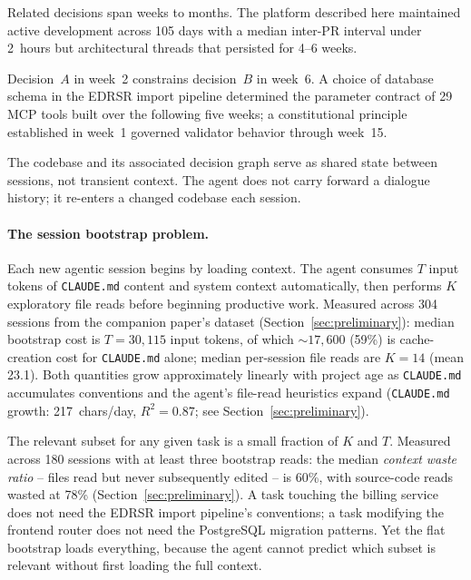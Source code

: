 \documentclass[11pt]{article}
\begin{document}
\begin{description}[leftmargin=1.5em, nosep]
  \item[Horizon.] Related decisions span weeks to months. The platform described here maintained active development across 105 days with a median inter-PR interval under 2~hours but architectural threads that persisted for 4--6 weeks.
  \item[Compositionality.] Decision~$A$ in week~2 constrains decision~$B$ in week~6. A choice of database schema in the EDRSR import pipeline determined the parameter contract of 29 MCP tools built over the following five weeks; a constitutional principle established in week~1 governed validator behavior through week~15.
  \item[Persistence.] The codebase and its associated decision graph serve as shared state between sessions, not transient context. The agent does not carry forward a dialogue history; it re-enters a changed codebase each session.
\end{description}

\paragraph{The session bootstrap problem.}
Each new agentic session begins by loading context.
The agent consumes $T$ input tokens of \texttt{CLAUDE.md} content and system context automatically, then performs $K$ exploratory file reads before beginning productive work.
Measured across 304 sessions from the companion paper's dataset (Section~\ref{sec:preliminary}): median bootstrap cost is $T = 30{,}115$ input tokens, of which ${\sim}17{,}600$ (59\%) is cache-creation cost for \texttt{CLAUDE.md} alone; median per-session file reads are $K = 14$ (mean 23.1).
Both quantities grow approximately linearly with project age as \texttt{CLAUDE.md} accumulates conventions and the agent's file-read heuristics expand (\texttt{CLAUDE.md} growth: 217~chars/day, $R^2 = 0.87$; see Section~\ref{sec:preliminary}).

The relevant subset for any given task is a small fraction of $K$ and $T$.
Measured across 180 sessions with at least three bootstrap reads: the median \emph{context waste ratio} -- files read but never subsequently edited -- is 60\%, with source-code reads wasted at 78\% (Section~\ref{sec:preliminary}).
A task touching the billing service does not need the EDRSR import pipeline's conventions; a task modifying the frontend router does not need the PostgreSQL migration patterns.
Yet the flat bootstrap loads everything, because the agent cannot predict which subset is relevant without first loading the full context.
\end{document}
